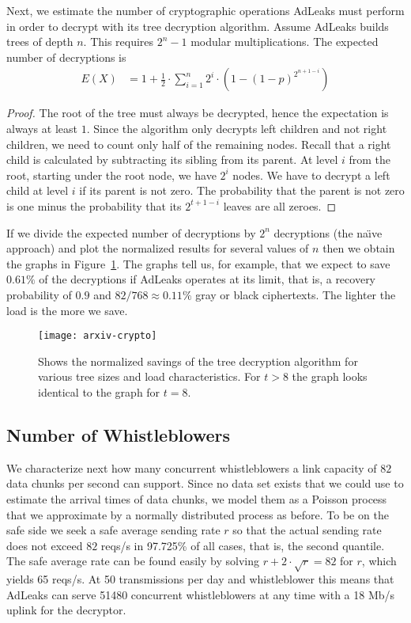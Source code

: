 \documentclass[twocolumn,10pt]{article}
\newcommand{\Kads}{50}
\newcommand{\Kp}{0.9}
\newcommand{\Kcapiii}{18}
\newcommand{\Ucapiii}{Mb/s}
\newcommand{\Kpktiii}{768}
\newcommand{\Kmaxdata}{82}
\newcommand{\Umaxdata}{reqs/s}
\newcommand{\Kavgdata}{65}
\newcommand{\Uavgdata}{reqs/s}
\newcommand{\Kpdata}{0.11}
\newcommand{\Ksavdec}{0.61}
\newcommand{\Kmaxwb}{51480}
\begin{document}
Next, we estimate the number of cryptographic operations AdLeaks must
perform in order to decrypt with its tree decryption algorithm.  Assume
AdLeaks builds trees of depth $n$.  This requires $2^{n}-1$ modular
multiplications.  The expected number of decryptions is
\begin{align*}
  E(X) &= 1 + \frac{1}{2}\cdot \sum_{i=1}^{n} 2^{i} \cdot
  (1-(1-p)^{2^{n+1-i}})
\end{align*}
\begin{proof}
  The root of the tree must always be decrypted, hence the expectation is
  always at least $1$.  Since the algorithm only decrypts left children and
  not right children, we need to count only half of the remaining nodes.
  Recall that a right child is calculated by subtracting its sibling from
  its parent.  At level $i$ from the root, starting under the root node, we
  have $2^i$ nodes.  We have to decrypt a left child at level $i$ if its
  parent is not zero.  The probability that the parent is not zero is one
  minus the probability that its $2^{t+1-i}$ leaves are all zeroes.
\end{proof}
If we divide the expected number of decryptions by $2^n$ decryptions (the
na\"\i{}ve approach) and plot the normalized results for several values of
$n$ then we obtain the graphs in Figure~\ref{fig:cryptcost}.  The graphs tell
us, for example, that we expect to save $\Ksavdec\%$ of the decryptions if
AdLeaks operates at its limit, that is, a recovery probability of $\Kp$ and
$\Kmaxdata/\Kpktiii \approx \Kpdata\%$ gray or black ciphertexts.  The
lighter the load is the more we save.

\begin{figure}
  \texttt{[image: arxiv-crypto]}
  \caption{Shows the normalized savings of the tree decryption algorithm for
    various tree sizes and load characteristics.  For $t>8$ the graph looks
    identical to the graph for $t=8$.}
  \label{fig:cryptcost}
\end{figure}



\subsection{Number of Whistleblowers}
\label{sec:numwb}

We characterize next how many concurrent whistleblowers a link capacity of
$\Kmaxdata$ data chunks per second can support.  Since no data set exists
that we could use to estimate the arrival times of data chunks, we model
them as a Poisson process that we approximate by a normally distributed
process as before.  To be on the safe side we seek a safe average sending
rate $r$ so that the actual sending rate does not exceed $\Kmaxdata$
\Umaxdata{} in 97.725\% of all cases, that is, the second quantile.  The
safe average rate can be found easily by solving $r+2\cdot\sqrt r=\Kmaxdata$
for $r$, which yields \Kavgdata{} \Uavgdata.  At \Kads{} transmissions per
day and whistleblower this means that AdLeaks can serve \Kmaxwb{} concurrent
whistleblowers at any time with a \Kcapiii{} \Ucapiii{} uplink for the
decryptor.
\end{document}
